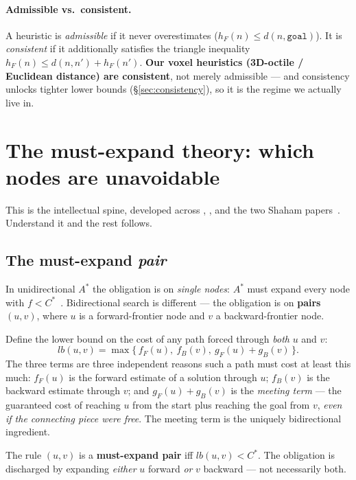 \documentclass[11pt]{article}
\newcommand{\gF}{g_F}
\newcommand{\gB}{g_B}
\newcommand{\hF}{h_F}
\newcommand{\fF}{f_F}
\newcommand{\fB}{f_B}
\newcommand{\Cstar}{C^{*}}
\newcommand{\lb}{\mathit{lb}}
\begin{document}
\paragraph{Admissible vs.\ consistent.}
A heuristic is \emph{admissible} if it never overestimates ($\hF(n)\le d(n,\texttt{goal})$).
It is \emph{consistent} if it additionally satisfies the triangle inequality
$\hF(n)\le d(n,n')+\hF(n')$. \textbf{Our voxel heuristics (3D-octile / Euclidean distance)
are consistent}, not merely admissible --- and consistency unlocks tighter lower bounds
(\S\ref{sec:consistency}), so it is the regime we actually live in.

\section{The must-expand theory: which nodes are unavoidable}
\label{sec:mustexpand}

This is the intellectual spine, developed across
\citet{eckerle2017sufficient}, \citet{chen2017nbs}, and the two Shaham
papers~\citep{shaham2017minimal,shaham2018consistent}. Understand it and the rest follows.

\subsection{The must-expand \emph{pair} \citep{eckerle2017sufficient}}
In unidirectional $A^{*}$ the obligation is on \emph{single nodes}: $A^{*}$ must expand
every node with $f<\Cstar$~\citep{dechter1985generalized}. Bidirectional search is
different --- the obligation is on \textbf{pairs} $(u,v)$, where $u$ is a forward-frontier
node and $v$ a backward-frontier node.

Define the lower bound on the cost of any path forced through \emph{both} $u$ and $v$:
\begin{equation}
  \lb(u,v)=\max\bigl\{\,\fF(u),\ \fB(v),\ \gF(u)+\gB(v)\,\bigr\}.
  \label{eq:lb}
\end{equation}
The three terms are three independent reasons such a path must cost at least this much:
$\fF(u)$ is the forward estimate of a solution through $u$; $\fB(v)$ is the backward
estimate through $v$; and $\gF(u)+\gB(v)$ is the \emph{meeting term} --- the guaranteed cost
of reaching $u$ from the start plus reaching the goal from $v$, \emph{even if the connecting
piece were free}. The meeting term is the uniquely bidirectional ingredient.

\begin{keybox}{The rule}
$(u,v)$ is a \textbf{must-expand pair} iff $\lb(u,v)<\Cstar$. The obligation is discharged
by expanding \emph{either} $u$ forward \emph{or} $v$ backward --- not necessarily both.
\end{keybox}
\end{document}
